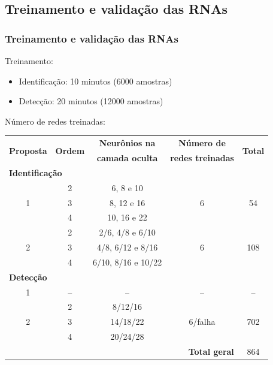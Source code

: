 \documentclass{beamer}
\begin{document}
\subsection{Treinamento e validação das RNAs}
\begin{frame}
    \frametitle{Treinamento e validação das RNAs}

    Treinamento:

\begin{itemize}
    \item Identificação: 10 minutos (6000 amostras)
    \item Detecção: 20 minutos (12000 amostras)
\end{itemize}

    Número de redes treinadas:

\begin{table}[htb]
\scriptsize
\centering
\begin{tabular}{|c|c|c|c|c|}
\hline
\multirow{2}{*}{\bf Proposta} & 
\multirow{2}{*}{\bf Ordem} & 
{\bf Neurônios na} & 
{\bf Número de} & 
\multirow{2}{*}{\bf Total}\\
& & {\bf camada oculta} & {\bf redes treinadas} &\\
\hline
\hline
\multicolumn{5}{|l|}{{\bf Identificação}}\\
\hline
\multirow{3}{*}{1} & 2 & 6, 8 e 10 & \multirow{3}{*}{6} & \multirow{3}{*}{54}\\
\cline{2-3}
& 3 & 8, 12 e 16 & &\\
\cline{2-3}
& 4 & 10, 16 e 22 & &\\
\hline
\multirow{3}{*}{2} & 2 & 2/6, 4/8 e 6/10 & 
\multirow{3}{*}{6} & \multirow{3}{*}{108}\\
\cline{2-3}
& 3 & 4/8, 6/12 e 8/16 & & \\
\cline{2-3}
& 4 & 6/10, 8/16 e 10/22 & & \\
\hline
\multicolumn{5}{|l|}{{\bf Detecção}}\\
\hline
1 & -- & -- & -- & --\\
\hline
\multirow{3}{*}{2} & 
2 & 8/12/16 & 
\multirow{3}{*}{6/falha} &
\multirow{3}{*}{702}\\
\cline{2-3}
& 3 & 14/18/22 & &\\
\cline{2-3}
& 4 & 20/24/28 & &\\
\hline
\hline
\multicolumn{4}{|r|}{{\bf Total geral}} & 864\\
\hline
\end{tabular}

\end{table}

\end{frame}
\end{document}

